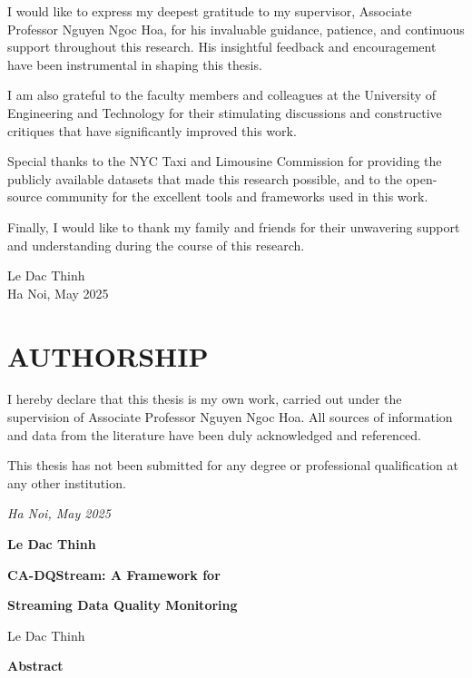 \documentclass[a4paper, reqno, oneside]{book}
\begin{document}
I would like to express my deepest gratitude to my supervisor, Associate Professor Nguyen Ngoc Hoa, for his invaluable guidance, patience, and continuous support throughout this research. His insightful feedback and encouragement have been instrumental in shaping this thesis.

I am also grateful to the faculty members and colleagues at the University of Engineering and Technology for their stimulating discussions and constructive critiques that have significantly improved this work.

Special thanks to the NYC Taxi and Limousine Commission for providing the publicly available datasets that made this research possible, and to the open-source community for the excellent tools and frameworks used in this work.

Finally, I would like to thank my family and friends for their unwavering support and understanding during the course of this research.

\vspace{2cm}
\begin{flushright}
Le Dac Thinh\\
Ha Noi, May 2025
\end{flushright}


\newpage
\chapter*{AUTHORSHIP}
\vspace{20pt}

I hereby declare that this thesis is my own work, carried out under the supervision of Associate Professor Nguyen Ngoc Hoa. All sources of information and data from the literature have been duly acknowledged and referenced.

This thesis has not been submitted for any degree or professional qualification at any other institution.


\vspace{2cm}
\begin{flushright}
{\it Ha Noi, May 2025}

{\bf Le Dac Thinh}
\end{flushright}

\newpage
\centerline{\bf CA-DQStream: A Framework for}
\centerline{\bf Streaming Data Quality Monitoring}
\vspace{10pt}
\centerline{Le Dac Thinh}

\vspace{2cm}
{\bf Abstract}
\end{document}
